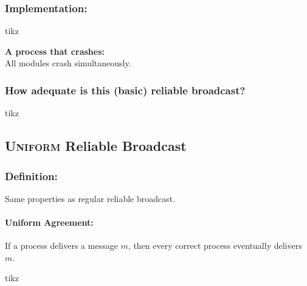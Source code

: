 \documentclass{article}
\begin{document}
\begin{adjustwidth}{2em}{2em}
\begin{adjustwidth}{2em}{2em}
			\subsubsection{Implementation:}
			\begin{center}
				tikz
			\end{center}
			\begin{adjustwidth}{2em}{}
				\textbf{A process that crashes:} \\
				All modules crash simultaneously.
			\end{adjustwidth}
			\subsubsection{How adequate is this (basic) reliable broadcast?}
			\begin{center}
				tikz
			\end{center}
			\begin{adjustwidth}{2em}{}
			\end{adjustwidth}
		\end{adjustwidth}
		\subsection{\textsc{Uniform} Reliable Broadcast}
		\begin{adjustwidth}{2em}{2em}
			\subsubsection{Definition:}
			\begin{adjustwidth}{2em}{}
				Same properties as regular reliable broadcast.
				\paragraph{Uniform Agreement:}
				\begin{adjustwidth}{1em}{}
					If a process delivers a message $m$, then every correct process eventually delivers $m$.
					\begin{center}
						tikz
					\end{center}
				\end{adjustwidth}
			\end{adjustwidth}

\end{adjustwidth}
\end{adjustwidth}
\end{document}
